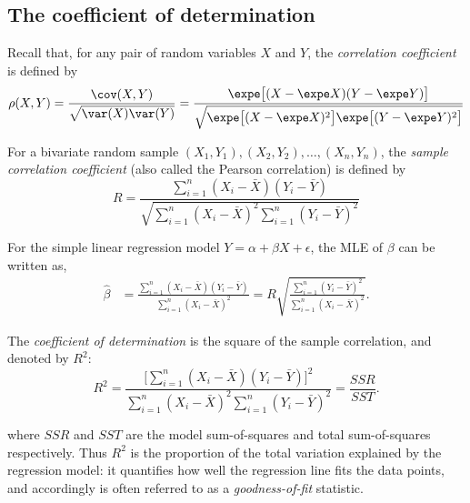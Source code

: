 \subsection{The coefficient of determination}

Recall that, for any pair of random variables $X$ and $Y$, the \emph{correlation coefficient} is defined by
\[
\rho(X,Y) 
	= \frac{\cov(X,Y)}{\sqrt{\var(X)\var(Y)}}
	= \frac{\expe\big[(X-\expe X)(Y-\expe Y)\big]}
			{\sqrt{\expe\big[(X-\expe X)^2\big]\expe\big[(Y-\expe Y)^2\big]}}
\]

For a bivariate random sample $(X_1,Y_1),(X_2,Y_2),\ldots,(X_n,Y_n)$, the \emph{sample correlation coefficient} (also called the Pearson correlation) is defined by
\[
R = \frac{\sum_{i=1}^n(X_i-\bar{X})(Y_i - \bar{Y})}{\sqrt{\sum_{i=1}^n(X_i-\bar{X})^2\sum_{i=1}^n(Y_i-\bar{Y})^2}} 
\]

For the simple linear regression model $Y=\alpha+\beta X + \epsilon$, the MLE of $\beta$ can be written as,
\begin{align*}
\hat{\beta}
	& = \frac{\sum_{i=1}^n (X_i-\bar{X})(Y_i-\bar{Y})}{\sum_{i=1}^n (X_i-\bar{X})^2} 
	= R\sqrt{\frac{\sum_{i=1}^n(Y_i-\bar{Y})^2}{\sum_{i=1}^n(X_i-\bar{X})^2}}.
\end{align*}

The \emph{coefficient of determination} is the square of the sample correlation, and denoted by $R^2$:
\[
R^2 
	= \frac{\big[\sum_{i=1}^n(X_i-\bar{X})(Y_i - \bar{Y})\big]^2}{\sum_{i=1}^n(X_i-\bar{X})^2\sum_{i=1}^n(Y_i-\bar{Y})^2}
	= \frac{SSR}{SST}.
\]

where $SSR$ and $SST$ are the model sum-of-squares and total sum-of-squares respectively. Thus $R^2$ is the proportion of the total variation explained by the regression model: it quantifies how well the regression line fits the data points, and accordingly is often referred to as a \emph{goodness-of-fit} statistic.



\stopcontents[chapters]
\endinput
